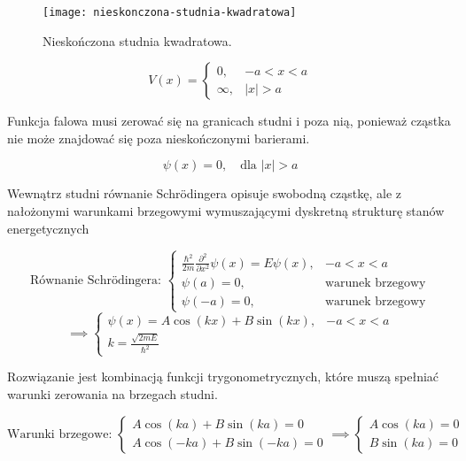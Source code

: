 \begin{figure}[H]
    \centering
    \texttt{[image: nieskonczona-studnia-kwadratowa]}
    \caption{Nieskończona studnia kwadratowa.}
    \label{fig:nieskonczona-studnia-kwadratowa}
\end{figure}

\begin{equation*}
    V(x) = 
    \begin{cases}
        0, & -a < x < a \\
        \infty, & |x| > a
    \end{cases}
\end{equation*}

Funkcja falowa musi zerować się na granicach studni i poza nią, ponieważ cząstka nie może znajdować się poza nieskończonymi barierami.

\begin{equation*}
    \psi(x) = 0, \quad \text{dla } |x| > a
\end{equation*}

Wewnątrz studni równanie Schrödingera opisuje swobodną cząstkę, ale z nałożonymi warunkami brzegowymi
wymuszającymi dyskretną strukturę stanów energetycznych

\begin{equation*}
    \text{Równanie Schrödingera: }
    \begin{cases}
        \frac{\hbar^2}{2m} \frac{\partial^2}{\partial x^2} \psi(x) = E \psi(x), & -a < x < a \\
        \psi(a) = 0, & \text{warunek brzegowy} \\
        \psi(-a) = 0, & \text{warunek brzegowy}
    \end{cases}
\end{equation*}
%
\begin{equation*}
    \implies
    \begin{cases}
        \psi(x) = A \cos(kx) + B \sin(kx), & -a < x < a \\
        k = \frac{\sqrt{2mE}}{\hbar^2}
    \end{cases}
\end{equation*}


Rozwiązanie jest kombinacją funkcji trygonometrycznych, które muszą spełniać warunki zerowania na brzegach studni.


\begin{equation*}
    \text{Warunki brzegowe: }
    \begin{cases}
        A \cos(ka) + B \sin(ka) = 0 \\
        A \cos(-ka) + B \sin(-ka) = 0
    \end{cases}
    \implies
    \begin{cases}
        A \cos(ka) = 0 \\
        B \sin(ka) = 0
    \end{cases}
\end{equation*}

